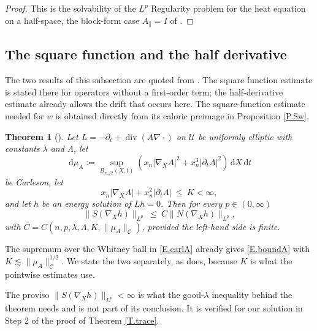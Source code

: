 \documentclass[10pt,a4paper]{amsart}
\numberwithin{equation}{section}
\DeclareMathOperator{\divg}{div}
\newcommand{\abs}[1]{\left\vert#1\right\vert}
\newcommand{\br}[1]{\left(#1\right)}
\newcommand{\pd}{\partial}
\newcommand{\Uc}{\mathcal U}
\newcommand{\Cc}{\mathcal C}
\renewcommand{\d}{\,\mathrm d}
\newcommand{\Cnorm}[1]{\|#1\|_{\Cc}}
\newtheorem{theorem}[equation]{Theorem}
\begin{document}
\begin{proof}
This is the solvability of the $L^p$ Regularity problem for the heat
equation on a half-space, the block-form case $A_\parallel=I$ of
\cite[Theorem 1.8]{DLP}.
\end{proof}

\subsection{The square function and the half derivative}\label{ss.NEU}

The two results of this subsection are quoted from \cite{DLPN}. The square
function estimate is stated there for operators without a first-order term;
the half-derivative estimate already allows the drift that occurs here. The
square-function estimate needed for $w$ is obtained directly from its caloric
preimage in Proposition \ref{P.Sw}.

\begin{theorem}[{\cite[Theorem 7.1]{DLPN}}]\label{T.SN}
Let $L=-\pd_t+\divg(A\nabla\cdot)$ on $\Uc$ be uniformly elliptic with
constants $\lambda$ and $\Lambda$, let
\begin{equation}\label{E.carlA}
  \d\mu_A:=\sup_{B_{x_n/2}(X,t)}\br{x_n\abs{\nabla_XA}^2
   +x_n^3\abs{\pd_tA}^2}\d X\d t
\end{equation}
be Carleson, let
\begin{equation}\label{E.boundA}
  x_n\abs{\nabla_XA}+x_n^2\abs{\pd_tA}\ \le\ K<\infty ,
\end{equation}
and let $h$ be an energy solution of $Lh=0$. Then for
every $p\in(0,\infty)$
$$\big\|S(\nabla_Xh)\big\|_{L^p}\ \le\ C\big\|N(\nabla_Xh)\big\|_{L^p},$$
with $C=C(n,p,\lambda,\Lambda,K,\Cnorm{\mu_A})$, provided the left-hand side is
finite.
\end{theorem}

\noindent The supremum over the Whitney ball in \eqref{E.carlA} already gives
\eqref{E.boundA} with $K\lesssim\Cnorm{\mu_A}^{1/2}$. We state the two
separately, as \cite{DLPN} does, because $K$ is what the pointwise estimates
use.

\noindent The proviso $\|S(\nabla_Xh)\|_{L^p}<\infty$ is what the good-$\lambda$
inequality behind the theorem needs and is not part of its conclusion. It is
verified for our solution in Step 2 of the proof of Theorem \ref{T.trace}.
\end{document}

